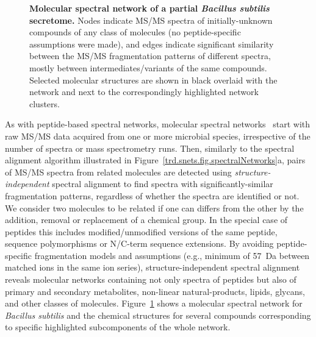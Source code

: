 \documentclass[arial,11pt]{article}
\begin{document}
\begin{figure}[htb!]
\centering

  \caption{\footnotesize{\bf Molecular spectral network of a partial {\em Bacillus subtilis} secretome.} Nodes indicate MS/MS spectra of initially-unknown compounds of any class of molecules (no peptide-specific assumptions were made), and edges indicate significant similarity between the MS/MS fragmentation patterns of different spectra, mostly between intermediates/variants of the same compounds. Selected molecular structures are shown in black overlaid with the network and next to the correspondingly highlighted network clusters.}
  \label{trd.snets.figMolSpecNets}
\end{figure}

As with peptide-based spectral networks, molecular spectral networks~\cite{watrous12} start with raw MS/MS data acquired from one or more microbial species, irrespective of the number of spectra or mass spectrometry runs. Then, similarly to the spectral alignment algorithm illustrated in \mbox{Figure~\ref{trd.snets.fig.spectralNetworks}a}, pairs of MS/MS spectra from related molecules are detected using {\em structure-independent} spectral alignment to find spectra with significantly-similar fragmentation patterns, regardless of whether the spectra are identified or not. We consider two molecules to be related if one can differs from the other by the addition, removal or replacement of a chemical group. In the special case of peptides this includes modified/unmodified versions of the same peptide, sequence polymorphisms or N/C-term sequence extensions. By avoiding peptide-specific fragmentation models and assumptions (e.g., minimum of 57~Da between matched ions in the same ion series), structure-independent spectral alignment reveals molecular networks containing not only spectra of peptides but also of primary and secondary metabolites, non-linear natural-products, lipids, glycans, and other classes of molecules. Figure~\ref{trd.snets.figMolSpecNets} shows a molecular spectral network for {\em Bacillus subtilis} %
and the chemical structures for several compounds corresponding to specific highlighted subcomponents of the whole network.
\end{document}
